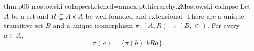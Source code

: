 \begin{hbtheorem}{thm:p06-mostowski-collapse}{sketched=annex:p6.hierarchy.2}{Mostowski collapse}
Let \(A\) be a set and \(R\subseteq A\times A\) be well-founded and
extensional.  There are a unique transitive set \(B\) and a unique isomorphism
\(\pi:(A,R)\to(B,\in)\).  For every \(a\in A\),
\[
 \pi(a)=\{\pi(b):bRa\}.
\]
\end{hbtheorem}
